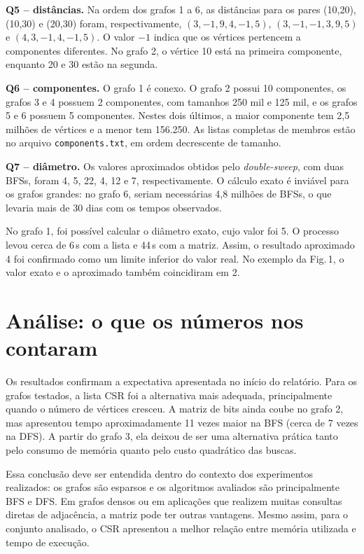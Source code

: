 \documentclass[11pt,a4paper]{article}
\begin{document}
\textbf{Q5 -- dist\^ancias.} Na ordem dos grafos 1 a 6, as dist\^ancias para os pares
(10,20), (10,30) e (20,30) foram, respectivamente, $(3,-1,9,4,-1,5)$,
$(3,-1,-1,3,9,5)$ e $(4,3,-1,4,-1,5)$. O valor $-1$ indica que os v\'ertices
pertencem a componentes diferentes. No grafo 2, o v\'ertice 10 est\'a na primeira
componente, enquanto 20 e 30 est\~ao na segunda.

\textbf{Q6 -- componentes.} O grafo 1 \'e conexo. O grafo 2 possui 10 componentes,
os grafos 3 e 4 possuem 2 componentes, com tamanhos 250 mil e 125 mil, e os grafos
5 e 6 possuem 5 componentes. Nestes dois \'ultimos, a maior componente tem 2,5
milh\~oes de v\'ertices e a menor tem 156.250. As listas completas de membros est\~ao
no arquivo \texttt{components.txt}, em ordem decrescente de tamanho.

\textbf{Q7 -- di\^ametro.} Os valores aproximados obtidos pelo \textit{double-sweep},
com duas BFSs, foram 4, 5, 22, 4, 12 e 7, respectivamente. O c\'alculo exato \'e
invi\'avel para os grafos grandes: no grafo 6, seriam necess\'arias 4,8 milh\~oes de
BFSs, o que levaria mais de 30 dias com os tempos observados.

No grafo 1, foi poss\'ivel calcular o di\^ametro exato, cujo valor foi 5. O processo
levou cerca de 6\,s com a lista e 44\,s com a matriz. Assim, o resultado aproximado
4 foi confirmado como um limite inferior do valor real. No exemplo da Fig.\,1, o
valor exato e o aproximado tamb\'em coincidiram em 2.

\section{An\'alise: o que os n\'umeros nos contaram}
Os resultados confirmam a expectativa apresentada no in\'icio do relat\'orio. Para os
grafos testados, a lista CSR foi a alternativa mais adequada, principalmente quando o
n\'umero de v\'ertices cresceu. A matriz de bits ainda coube no grafo 2, mas apresentou
tempo aproximadamente 11 vezes maior na BFS (cerca de 7 vezes na DFS). A partir do grafo 3, ela deixou de
ser uma alternativa pr\'atica tanto pelo consumo de mem\'oria quanto pelo custo
quadr\'atico das buscas.

Essa conclus\~ao deve ser entendida dentro do contexto dos experimentos realizados:
os grafos s\~ao esparsos e os algoritmos avaliados s\~ao principalmente BFS e DFS. Em
grafos densos ou em aplica\c c\~oes que realizem muitas consultas diretas de adjac\^encia,
a matriz pode ter outras vantagens. Mesmo assim, para o conjunto analisado, o CSR
apresentou a melhor rela\c c\~ao entre mem\'oria utilizada e tempo de execu\c c\~ao.
\end{document}
